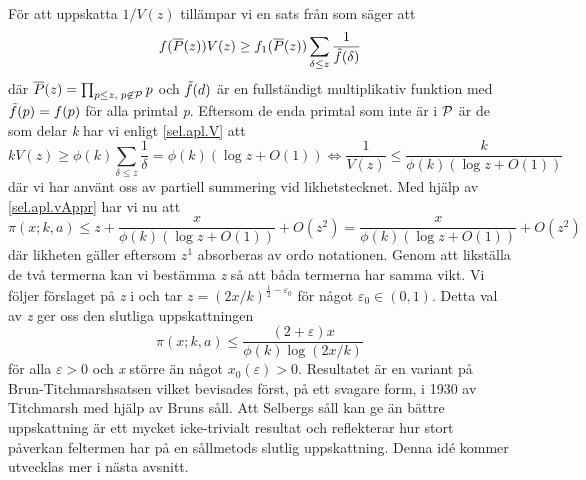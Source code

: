 För att uppskatta \(1/V(z)\) tillämpar vi en sats från \cite[Kap. 7]{cojocarumurty} som säger att
\begin{equation}
    f(\overline{P}(z))V(z) \geq f_1(\overline{P}(z))\sum_{\delta \leq z}\frac{1}{\Tilde{f}(\delta)}\label{sel.apl.V}
\end{equation}
där \(\overline{P}(z) = \prod_{p\leq z,\; p \not \in \P}p\) och \(\Tilde{f}(d)\) är en fullständigt multiplikativ funktion med \(\Tilde{f}(p) = f(p)\) för alla primtal \textit{p}. 
Eftersom de enda primtal som inte är i \(\P\) är de som delar \textit{k} har vi enligt \eqref{sel.apl.V} att 
\begin{equation}
    kV(z) \geq \phi(k) \sum_{\delta \leq z}\frac{1}{\delta} = \phi(k)(\log z + O(1)) \iff \frac{1}{V(z)} \leq \frac{k}{\phi(k)(\log z + O(1))}\label{sel.apl.vAppr}
\end{equation}
där vi har använt oss av partiell summering vid likhetstecknet. 
Med hjälp av \eqref{sel.apl.vAppr} har vi nu att
\begin{equation}
     \pi(x;k,a) \leq z + \frac{x}{\phi(k)(\log z + O(1))} + O(z^2) = \frac{x}{\phi(k)(\log z + O(1))} + O(z^2)\nonumber
\end{equation}
där likheten gäller eftersom \(z^1\) absorberas av ordo notationen. 
Genom att likställa de två termerna kan vi bestämma \textit{z} så att båda termerna har samma vikt. Vi följer förslaget på \textit{z} i \cite{cojocarumurty} och tar \(z = (2x/k)^{\frac{1}{2}-\varepsilon_0}\) för något \(\varepsilon_0\in(0, 1)\). Detta val av \textit{z} ger oss den slutliga uppskattningen
\begin{equation}
    \pi(x;k,a) \leq \frac{(2+\varepsilon)x}{\phi(k)\log(2x/k)}\nonumber
\end{equation}
för alla \(\varepsilon > 0\) och \textit{x} större än något \(x_0(\varepsilon) >0\). 
Resultatet är en variant på Brun-Titchmarshsatsen vilket bevisades först, på ett svagare form, i 1930 av Titchmarsh \cite{BrunTitch} med hjälp av Bruns såll. 
Att Selbergs såll kan ge än bättre uppskattning är ett mycket icke-trivialt resultat och reflekterar hur stort påverkan feltermen har på en sållmetods slutlig uppskattning.
Denna idé kommer utvecklas mer i nästa avsnitt.